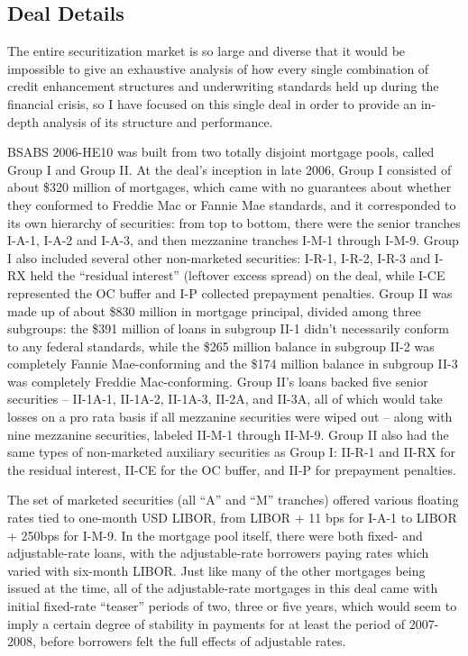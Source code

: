 \documentclass[12pt]{article}
\begin{document}
\subsection*{Deal Details}

The entire securitization market is so large and diverse that it would be impossible to give an exhaustive analysis of how every single combination of credit enhancement structures and underwriting standards held up during the financial crisis, so I have focused on this single deal in order to provide an in-depth analysis of its structure and performance.

BSABS 2006-HE10 was built from two totally disjoint mortgage pools, called Group I and Group II. At the deal’s inception in late 2006, Group I consisted of about \$320 million of mortgages, which came with no guarantees about whether they conformed to Freddie Mac or Fannie Mae standards, and it corresponded to its own hierarchy of securities: from top to bottom, there were the senior tranches I-A-1, I-A-2 and I-A-3, and then mezzanine tranches I-M-1 through I-M-9. Group I also included several other non-marketed securities: I-R-1, I-R-2, I-R-3 and I-RX held the “residual interest” (leftover excess spread) on the deal, while I-CE represented the OC buffer and I-P collected prepayment penalties. Group II was made up of about \$830 million in mortgage principal, divided among three subgroups: the \$391 million of loans in subgroup II-1 didn’t necessarily conform to any federal standards, while the \$265 million balance in subgroup II-2 was completely Fannie Mae-conforming and the \$174 million balance in subgroup II-3 was completely Freddie Mac-conforming. Group II’s loans backed five senior securities – II-1A-1, II-1A-2, II-1A-3, II-2A, and II-3A, all of which would take losses on a pro rata basis if all mezzanine securities were wiped out – along with nine mezzanine securities, labeled II-M-1 through II-M-9. Group II also had the same types of non-marketed auxiliary securities as Group I: II-R-1 and II-RX for the residual interest, II-CE for the OC buffer, and II-P for prepayment penalties.

The set of marketed securities (all “A” and “M” tranches) offered various floating rates tied to one-month USD LIBOR, from LIBOR + 11 bps for I-A-1 to LIBOR + 250bps for I-M-9. In the mortgage pool itself, there were both fixed- and adjustable-rate loans, with the adjustable-rate borrowers paying rates which varied with six-month LIBOR. Just like many of the other mortgages being issued at the time, all of the adjustable-rate mortgages in this deal came with initial fixed-rate “teaser” periods of two, three or five years, which would seem to imply a certain degree of stability in payments for at least the period of 2007-2008, before borrowers felt the full effects of adjustable rates.
\end{document}
